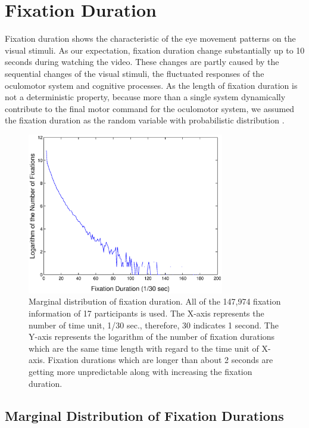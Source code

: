 \documentclass[10pt,letterpaper]{article}
\begin{document}
\section{Fixation Duration}

Fixation duration shows the characteristic of the eye movement patterns on the visual stimuli. As our expectation, fixation duration change substantially up to 10 seconds during watching the video. These changes are partly caused by the sequential changes of the visual stimuli, the fluctuated responses of the oculomotor system and cognitive processes. As the length of fixation duration is not a deterministic property, because more than a single system dynamically contribute to the final motor command for the oculomotor system, we assumed the fixation duration as the random variable with probabilistic distribution \cite{Rayner1998,Reichle2004,Reichle2006}.

\begin{figure}
  \centerline{\includegraphics[width=86mm,trim=10mm 3mm 10mm 3mm]{./eps/marginal_fixation_duration.eps}}
  \caption{Marginal distribution of fixation duration. All of the 147,974 fixation information of 17 participants is used. The X-axis represents the number of time unit, 1/30 sec., therefore, 30 indicates 1 second. The Y-axis represents the logarithm of the number of fixation durations which are the same time length with regard to the time unit of X-axis. Fixation durations which are longer than about 2 seconds are getting more unpredictable along with increasing the fixation duration.}
  \label{fig:marginal-fixation-duration}
\end{figure}

\subsection{Marginal Distribution of Fixation Durations}
\end{document}
